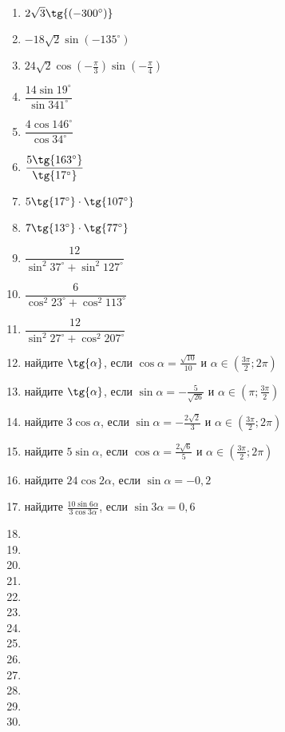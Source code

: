 \begin{enumerate}
	\item $2\sqrt{3}\tg{\left( -300^{\circ}\right) }$
	\item $-18\sqrt{2}\sin{\left( -135^{\circ}\right) }$
	\item $24\sqrt{2}\cos{\left( -\frac{\pi}{3}\right) } \sin{\left( -\frac{\pi}{4}\right) }$
	\item $\dfrac{14\sin{19^{\circ}}}{\sin{341^{\circ}}}$
	\item $\dfrac{4\cos{146^{\circ}}}{\cos{34^{\circ}}}$
	
	\item $\dfrac{5\tg{163^{\circ}}}{\tg{17^{\circ}}}$
	\item $5\tg{17^{\circ}} \cdot \tg{107^{\circ}}$
	\item $7\tg{13^{\circ}} \cdot \tg{77^{\circ}}$
	\item $\dfrac{12}{\sin^{2}{37^{\circ}} + \sin^{2}{127^{\circ}}}$ 
	\item $\dfrac{6}{\cos^{2}{23^{\circ}} + \cos^{2}{113^{\circ}}}$
	 
	\item $\dfrac{12}{\sin^{2}{27^{\circ}} + \cos^{2}{207^{\circ}}}$ 
	\item найдите $\tg{\alpha}$, если $\cos{\alpha} = \frac{\sqrt{10}}{10}$ и $\alpha \in \left(\frac{3\pi}{2}; 2\pi\right) $
	\item найдите $\tg{\alpha}$, если $\sin{\alpha} = -\frac{5}{\sqrt{26}}$ и $\alpha \in \left(\pi; \frac{3\pi}{2}\right) $
	\item найдите $3\cos{\alpha}$, если $\sin{\alpha} = -\frac{2\sqrt{2}}{3}$ и $\alpha \in \left(\frac{3\pi}{2}; 2\pi\right) $
	\item найдите $5\sin{\alpha}$, если $\cos{\alpha} = \frac{2\sqrt{6}}{5}$ и $\alpha \in \left(\frac{3\pi}{2}; 2\pi\right) $
	
	\item найдите $24\cos{2\alpha}$, если $\sin{\alpha} = -0,2$
	\item найдите $\frac{10\sin{6\alpha}}{3\cos{3\alpha}}$, если $\sin{3\alpha} = 0,6$
	\item
	\item
	\item
	
	\item
	\item
	\item
	\item
	\item
	
	\item
	\item
	\item
	\item
	\item
	

\end{enumerate}
